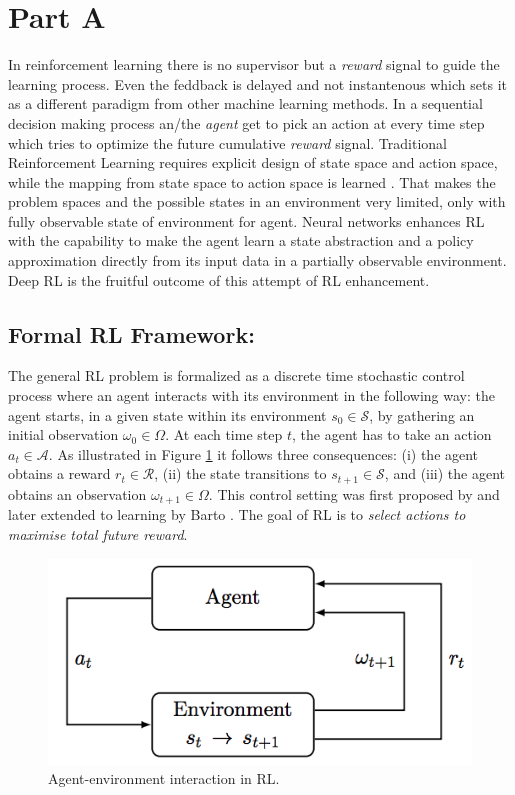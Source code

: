 \section{Part A}
\label{part_a}
In reinforcement learning there is no supervisor but a {\em reward} signal to guide the learning process. Even the feddback is delayed and not instantenous which sets it as a different paradigm from other machine learning methods. In a sequential decision making process an/the {\em agent} get to pick an action at every time step which tries to optimize the future cumulative {\em reward} signal.
Traditional Reinforcement Learning
requires explicit design of state space and action space, while the mapping from state space to action space is learned \cite{sutton1998introduction}.
 That makes the problem spaces and the possible states in an environment very limited, only with fully observable state of environment for agent.  Neural networks enhances RL with the capability to make the agent learn a state abstraction and a policy approximation directly from its input data in a partially observable environment. Deep RL is the fruitful outcome of this attempt of RL enhancement.

\subsection*{Formal RL Framework:}
The general RL problem is formalized as a discrete time stochastic
control process where an agent interacts with its environment in the
following way: the agent starts, in a given state within its environment
$s_0 \in \mathcal{S}$, by gathering an initial observation $\omega_0 \in \Omega$. At each time
step $t$, the agent has to take an action $a_t \in \mathcal{A}$. As illustrated in
Figure \ref{fig:rl_01} it follows three consequences: (i) the agent obtains a reward
$r_t \in \mathcal{R}$, (ii) the state transitions to $s_{t+1} \in \mathcal{S}$, and (iii) the agent obtains
an observation $\omega_{t+1} \in \Omega$. This control setting was first proposed by
\cite{bellman1957dynamic} and later extended to learning by Barto \cite{barto1983neuronlike}.
The goal of RL is to {\em select actions to maximise total future reward}.
\begin{figure}[t]
	\includegraphics[width=0.7\linewidth ]{fig/agent.png}
    \vspace{-2mm}
    \caption{Agent-environment interaction in RL.}
    \label{fig:rl_01}
\end{figure}

